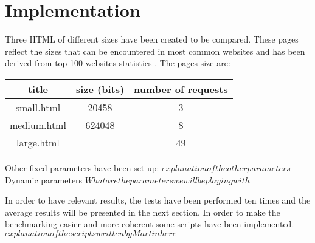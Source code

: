 \section{Implementation}
\label{implementation}
Three HTML of different sizes have been created to be compared. These pages reflect the sizes that can be encountered in most common websites and has been derived from top 100 websites statistics \cite{httparchive}. The pages size are:
\begin{center}
  \begin{tabular}{ | c | c | c | }
    \hline
    title & size (bits) & number of requests \\ \hline \hline
    small.html &  20458 & 3 \\ \hline
    medium.html &  624048 & 8\\ \hline 
    large.html &  & 49 \\
    \hline
  \end{tabular}
\end{center} 
Other fixed parameters have been set-up:
$explanation of the other parameters $
Dynamic parameters
$What are the parameters we will be playing with$

In order to have relevant results, the tests have been performed ten times and the average results will be presented in the next section. In order to make the benchmarking easier and more coherent some scripts have been implemented.
$explanation of the scripts written by Martin here$

